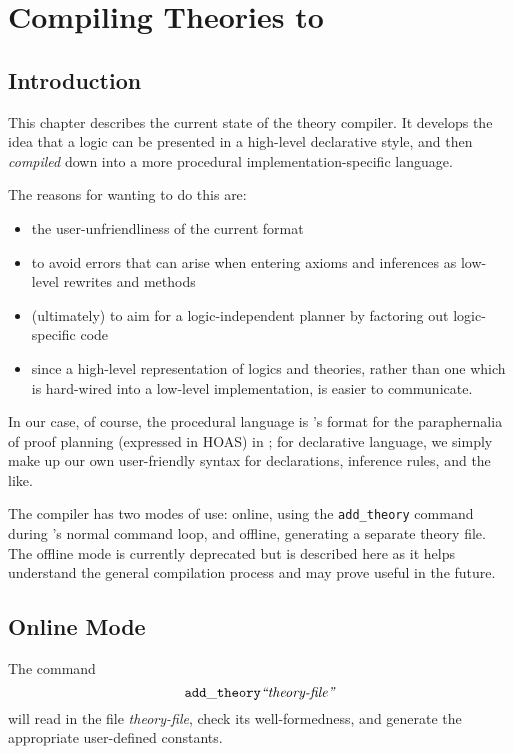 \newcommand{\lyacc}{$\lambda$yacc\xspace}

\chapter{Compiling Theories to \lclam}\label{compiler}


\section{Introduction}

This chapter describes the current state of the \lclam theory
compiler.  It develops the idea that a logic can be presented in a
high-level declarative style, and then {\em compiled} down into a more
procedural implementation-specific language.

The reasons for wanting to do this are:
\begin{itemize}
\item the user-unfriendliness of the current \lclam format
\item to avoid errors that can arise when entering axioms and
  inferences as low-level rewrites and methods
\item (ultimately) to aim for a logic-independent planner by factoring out
  logic-specific code
\item since a high-level representation of logics and theories, rather than
  one which is hard-wired into a low-level implementation, is easier
  to communicate.
\end{itemize}

In our case, of course, the procedural language is \lclam's format for
the paraphernalia of proof planning (expressed in HOAS) in \lprolog;
for declarative language, we simply make up our own user-friendly
syntax for declarations, inference rules, and the like.


The compiler has two modes of use: online, using the {\tt add\_theory}
command during \lclam's normal command loop, and offline, generating a
separate \lclam theory file.  The offline mode is currently deprecated
but is described here as it helps understand the general compilation
process and may prove useful in the future.

\section{Online Mode}

The command
$${\tt add\_theory} \mbox{\em ``theory-file''}$$
will read in the file
{\em theory-file}, check its well-formedness, and generate the
appropriate user-defined constants.

